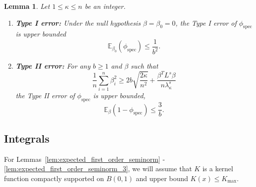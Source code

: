 \documentclass{article}
\newcommand{\1}{\mathbf{1}}
\newcommand{\spec}{\mathrm{spec}}
\theoremstyle{alden}
\theoremstyle{aldenthm}
\newtheorem{lemma}{Lemma}
\theoremstyle{definition}
\theoremstyle{remark}
\begin{document}
\begin{lemma}
	\label{lem:fixed_graph_testing}
	Let $1 \leq \kappa \leq n$ be an integer.
	\begin{enumerate}
		\item \textbf{Type I error:} Under the null hypothesis $\beta = \beta_0 = 0$, the Type I error of $\phi_{\spec}$ is upper bounded
		\begin{equation}
		\label{eqn:graph_spectral_type_I_error}
		\mathbb{E}_{\beta_0}(\phi_{\spec}) \leq \frac{1}{b^2}.
		\end{equation}
		\item \textbf{Type II error:} For any $b \geq 1$ and $\beta$ such that
		\begin{equation}
		\label{eqn:fixed_graph_testing_critical_radius}
		\frac{1}{n} \sum_{i = 1}^{n} \beta_i^2 \geq 2b\sqrt{\frac{2\kappa}{n^2}} + \frac{\beta^T L^s \beta}{n\lambda_{\kappa}^s}
		\end{equation}
		the Type II error of $\phi_{\spec}$ is upper bounded,
		\begin{equation}
		\label{eqn:graph_spectral_type_II_error}
		\mathbb{E}_{\beta}(1 - \phi_{\spec}) \leq \frac{3}{b}.
		\end{equation}
	\end{enumerate}
\end{lemma}

\subsection{Integrals}

For Lemmas~\ref{lem:expected_first_order_seminorm} - \ref{lem:expected_first_order_seminorm_3}, we will assume that $K$ is a kernel function compactly supported on $B(0,1)$ and upper bound $K(x) \leq K_{\max}$.
\end{document}
